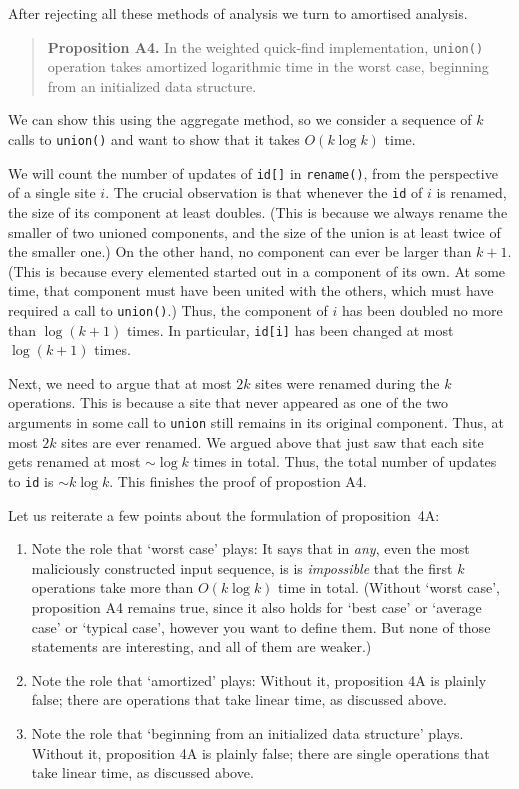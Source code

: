 \documentclass{tufte-handout}
\begin{document}
\medskip
After rejecting all these methods of analysis we turn to amortised analysis.

\begin{quote}
  {\bf Proposition A4.} In the weighted quick-find implementation, {\tt union()} operation takes amortized logarithmic time in the worst case, beginning from an initialized data structure.
\end{quote}

We can show this using the aggregate method, so we consider a sequence of $k$ calls to {\tt union()} and want to show that it takes $O(k\log k)$ time.

We will count the number of updates of {\tt id[]} in {\tt rename()}, from the perspective of a single site $i$. 
The crucial observation is that whenever the {\tt id} of $i$ is renamed, the size of its component at least doubles.
(This is because we always rename the smaller of two unioned components, and the size of the union is at least twice of the smaller one.)
On the other hand, no component can ever be larger than $k+1$. 
(This is because every elemented started out in a component of its own.
At some time, that component must have been united with the others, which must have required a call to {\tt union()}.)
Thus, the component of $i$ has been doubled no more than $\log (k+1)$ times.
In particular, {\tt id[i]} has been changed at most $\log (k+1)$ times.

Next, we need to argue that at most $2k$ sites were renamed during the $k$ operations.
This is because a site that never appeared as one of the two arguments in some call to {\tt union} still remains in its original component.
Thus, at most $2k$ sites are ever renamed.
We argued above that just saw that each site gets renamed at most $\sim\log k$ times in total.
Thus, the total number of updates to {\tt id} is $\sim k\log k$. 
This finishes the proof of propostion A4.
\bigskip

Let us reiterate a few points about the formulation of proposition~4A:
\begin{enumerate}
  \item  Note the role that `worst case' plays:
    It says that in \emph{any}, even the most maliciously constructed input sequence, is is \emph{impossible} that the first $k$ operations take more than $O(k\log k)$ time in total.
    (Without `worst case', proposition A4 remains true, since it also holds for `best case' or `average case' or `typical case', however you want to define them.
    But none of those statements are interesting, and all of them are weaker.)
\item Note the role that `amortized' plays:
  Without it, proposition 4A is plainly false; there are operations that take linear time, as discussed above.
\item Note the role that `beginning from an initialized data structure' plays. 
  Without it, proposition 4A is plainly false; there are single operations that take linear time, as discussed above.
\end{enumerate}
\end{document}
